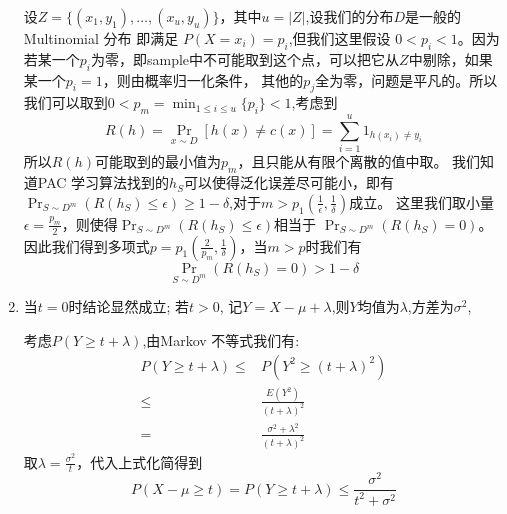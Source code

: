 \documentclass{article}
\begin{document}
\begin{enumerate}
设$Z=\{(x_1,y_1),\dots,(x_u,y_u)\}$，其中$u=|Z|$,设我们的分布$D$是一般的 Multinomial 分布 即满足 $P(X=x_i)=p_i$,但我们这里假设
$0<p_i<1$。因为若某一个$p_i$为零，即sample中不可能取到这个点，可以把它从$Z$中剔除，如果某一个$p_i=1$，则由概率归一化条件，
其他的$p_j$全为零，问题是平凡的。所以我们可以取到$0<p_m=\min_{1\leq i\leq u}\{p_i\}<1$,考虑到
\begin{equation}
R(h)=\Pr_{x \sim D}[h(x)\neq c(x)]=\sum_{i=1}^u 1_{h(x_i)\neq y_i}
\end{equation}
所以$R(h)$可能取到的最小值为$p_m$，且只能从有限个离散的值中取。
我们知道PAC 学习算法找到的$h_S$可以使得泛化误差尽可能小，即有
$\Pr_{S\sim D^m}(R(h_S)\leq \epsilon)\geq 1-\delta$,对于$m>p_1(\frac{1}{\epsilon},\frac{1}{\delta})$成立。
这里我们取小量$\epsilon =\frac{p_m}{2}$，则使得$\Pr_{S\sim D^m}(R(h_S)\leq \epsilon)$相当于
$\Pr_{S\sim D^m}(R(h_S)=0)$。
因此我们得到多项式$p=p_1(\frac{2}{p_m},\frac{1}{\delta})$，当$m>p$时我们有
\begin{equation*}
\Pr_{S\sim D^m}(R(h_S)=0)>1-\delta
\end{equation*}

\item
当$t=0$时结论显然成立;
若$t>0$,
记$Y=X-\mu+\lambda$,则$Y$均值为$\lambda$,方差为$\sigma^2$,

考虑$P(Y\geq t+\lambda)$,由Markov 不等式我们有:
\begin{align}
P(Y\geq t+\lambda) \leq & P(Y^2\geq (t+\lambda)^2)\\
\leq & \frac{E(Y^2)}{(t+\lambda)^2}\\
= & \frac{\sigma^2+\lambda^2}{(t+\lambda)^2}
\end{align}
取$\lambda=\frac{\sigma^2}{t}$，代入上式化简得到
\begin{equation}
P(X-\mu \geq t) = P(Y\geq t+\lambda) \leq \frac{\sigma^2}{t^2+\sigma^2}
\end{equation}
\end{enumerate}
\end{document}
